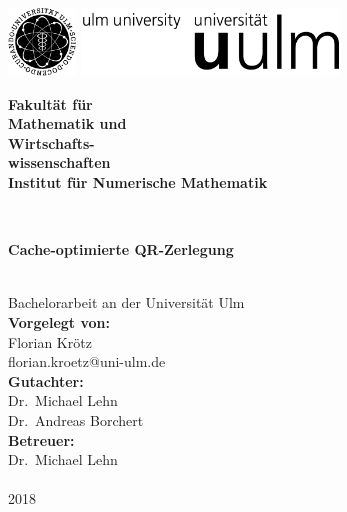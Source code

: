 \documentclass[a4paper,12pt,
headsepline,        %
oneside,            %
bibtotoc,           %
pointlessnumbers,   %
BCOR15mm             %
]{scrbook}
\makeatletter
\newcommand{\fullname}{Florian Krötz}
\newcommand{\email}{florian.kroetz@uni-ulm.de}
\newcommand{\titel}{Cache-optimierte QR-Zerlegung}
\newcommand{\jahr}{2018}
\newcommand{\gutachterA}{Dr.~Michael Lehn}
\newcommand{\gutachterB}{Dr.~Andreas Borchert}
\newcommand{\betreuer}{Dr.~Michael Lehn}
\newcommand{\fakultaet}{Mathematik und\\Wirtschafts-\\wissenschaften}
\newcommand{\institut}{Institut für Numerische Mathematik}
\makeatother
\begin{document}
	\frontmatter
	
	\thispagestyle{empty}
	\begin{addmargin*}[4mm]{-10mm}
		
		\includegraphics[height=1.8cm]{images/unilogo_bild}
		\hfill
		\includegraphics[height=1.8cm]{images/unilogo_wort}\\[1em]
		
		{\footnotesize
			\hspace*{115mm}\parbox[t]{35mm}{\bfseries Fakultät für\\
				\fakultaet\\
				
				\mdseries \institut}\\[2cm]
			
			\parbox{120mm}{\bfseries \LARGE \titel}\\[2.5em]
			{\footnotesize Bachelorarbeit an der Universität Ulm}\\[3em]
			
			{\footnotesize \bfseries Vorgelegt von:}\\
			{\footnotesize \fullname\\\email}\\[2em]
			{\footnotesize \bfseries Gutachter:}\\                     
			{\footnotesize\gutachterA\\
				\gutachterB}\\[2em]
			{\footnotesize \bfseries Betreuer:}\\ 
			{\footnotesize\betreuer}\\\\
			{\footnotesize\jahr}
		}
	\end{addmargin*}
	
\end{document}
